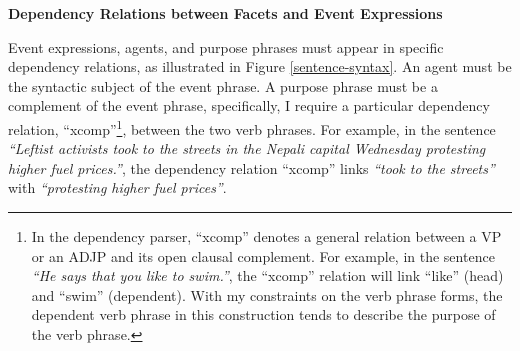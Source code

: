 \vspace{.1in}
{\bf Dependency Relations between Facets and Event Expressions}
\vspace{.1in}

Event expressions, agents, and purpose phrases must
appear in specific dependency relations, as illustrated
in Figure \ref{sentence-syntax}.  
An agent must be the syntactic
subject of the event phrase.  A purpose phrase
must be a complement of the event phrase, specifically, 
I require a particular dependency relation, ``xcomp''\footnote{In the dependency parser, 
``xcomp'' denotes a general relation between 
a VP or an ADJP and its open clausal complement. For example, in the
sentence {\it ``He says that you like to swim.''}, the ``xcomp''
relation will link ``like'' (head) and ``swim'' (dependent). With my
constraints on the verb phrase forms, the dependent verb phrase in
this construction tends to describe the purpose of the verb phrase.},  
between the two verb phrases.
For example, in the sentence {\it ``Leftist activists
  took to the streets in the Nepali capital Wednesday protesting
  higher fuel prices.''}, the dependency relation ``xcomp'' links
 {\it ``took to the streets''} with {\it
  ``protesting higher fuel prices''}. 



